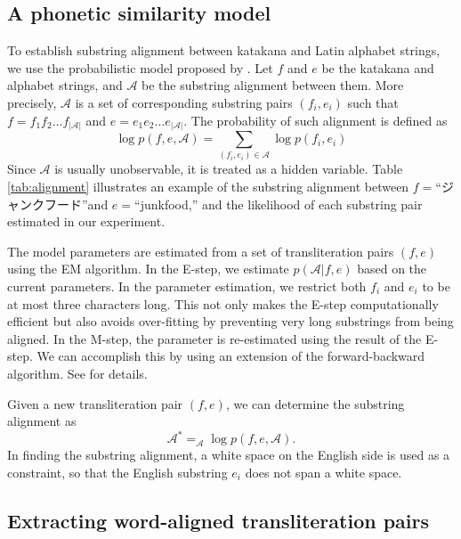 \documentclass[english]{jnlp_1.4_rep}
\newcommand{\argmax}{}
\begin{document}
\subsection{A phonetic similarity model}
\label{sec:phonetic_model}

To establish substring alignment between katakana and Latin alphabet
strings, we use the probabilistic model proposed by
\cite{Jiampojamarn07}. Let $f$ and $e$ be the katakana and alphabet
strings, and $\mathcal{A}$ be the substring alignment between them. More
precisely, $\mathcal{A}$ is a set of corresponding substring pairs
$(f_i, e_i)$ such that $f=f_1f_2\dots f_{|\mathcal{A}|}$ and
$e=e_1e_2\dots e_{|\mathcal{A}|}$. The probability of such alignment is
defined as
\[
 \log p(f,e,\mathcal{A})=\sum_{(f_i,e_i)\in\mathcal{A}}\log p(f_{i},e_{i})
\]
Since $\mathcal{A}$ is usually unobservable, it is treated as a hidden
variable. Table \ref{tab:alignment} illustrates an example of the 
substring alignment between $f=$“ジャンクフード”and $e=$``junkfood,''
and the likelihood of each substring pair estimated in our experiment.

\begin{table}[t]
   \label{tab:alignment}

\end{table}

The model parameters are estimated from a set of transliteration pairs
$(f,e)$ using the EM algorithm. In the E-step, we estimate
$p(\mathcal{A}|f,e)$ based on the current parameters. In the parameter
estimation, we restrict both $f_i$ and $e_i$ to be at most three
characters long. This not only makes the E-step computationally
efficient but also avoids over-fitting by preventing very long
substrings from being aligned.
In the M-step, the parameter is re-estimated using the result of the
E-step. We can accomplish this by using an extension of the
forward-backward algorithm. See \cite{Jiampojamarn07} for details.

Given a new transliteration pair $(f,e)$, we can determine the substring
alignment as
\[
\mathcal{A}^{*}=\argmax_{\mathcal{A}}\log p(f,e,\mathcal{A}). 
\]
In finding the substring alignment, a white space on the English side is
used as a constraint, so that the English substring $e_i$ does not span
a white space.


\subsection{Extracting word-aligned transliteration pairs}
\label{sec:extraction}
\end{document}
